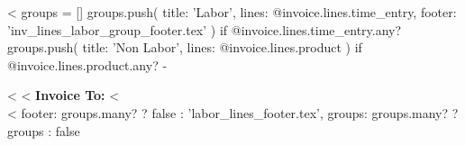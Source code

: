 <%
groups = []
groups.push(
  { title: 'Labor', lines: @invoice.lines.time_entry,
    footer: 'inv_lines_labor_group_footer.tex' }
) if @invoice.lines.time_entry.any?
groups.push(
  { title: 'Non Labor', lines: @invoice.lines.product }
) if @invoice.lines.product.any?
-%

<%
<%
\textbf{Invoice To:}
\medskip
\hspace*{3ex}{
  <%
}
\medskip
<%
\\[-5ex]
<%
    footer: groups.many? ? false : 'labor_lines_footer.tex',
    groups: groups.many? ? groups : false %

